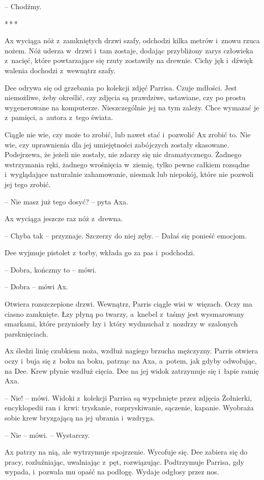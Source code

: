 \documentclass[oneside,polish,11pt,sfheadings]{mwbk}
\newcommand{\threeast}{\bigskip\par\centerline{*\,*\,*}\medskip\par}
\begin{document}
-- Chodźmy.

\threeast

Ax wyciąga nóż z~zamkniętych drzwi szafy, odchodzi kilka metrów i~znowu
rzuca nożem. Nóż uderza w~drzwi i~tam zostaje, dodając przybliżony zarys
człowieka z~nacięć, które powtarzające się rzuty zostawiły na drewnie.
Cichy jęk i~dźwięk walenia dochodzi z~wewnątrz szafy.

Dee odrywa się od grzebania po kolekcji zdjęć Parrisa. Czuje mdłości.
Jest niemożliwe, żeby określić, czy zdjęcia są prawdziwe, ustawiane, czy
po prostu wygenerowane na komputerze. Nieszczególnie jej na tym zależy.
Chce wymazać je z~pamięci, a~autora z~tego świata.

Ciągle nie wie, czy może to zrobić, lub nawet stać i~pozwolić Ax zrobić
to. Nie wie, czy uprawnienia dla jej umiejętności zabójczych zostały
skasowane. Podejrzewa, że jeżeli nie zostały, nie zdarzy się nic
dramatycznego. Żadnego wstrzymania ręki, żadnego wrośnięcia w~ziemię,
tylko pewne całkiem rozsądne i~wyglądające naturalnie zahamowanie,
niesmak lub niepokój, które nie pozwoli jej tego zrobić.

-- Nie masz już tego dosyć? -- pyta Axa.

Ax wyciąga jeszcze raz nóż z~drewna. 

-- Chyba tak -- przyznaje. Szczerzy
do niej zęby. -- Dałaś się ponieść emocjom.

Dee wyjmuje pistolet z~torby, wkłada go za pas i~podchodzi.

-- Dobra, kończmy to -- mówi.

-- Dobra -- mówi Ax.

Otwiera rozszczepione drzwi. Wewnątrz, Parris ciągle wisi w~więzach.
Oczy ma ciasno zamknięte. Łzy płyną po twarzy, a~knebel z~taśmy jest
wysmarowany smarkami, które przyniosły łzy i~który wydmuchał z~nozdrzy w~szalonych parsknięciach.

Ax śledzi linię czubkiem noża, wzdłuż nagiego brzucha mężczyzny. Parris
otwiera oczy i~buja się z~boku na boku, patrząc na Axa, a~potem, jak
gdyby odwołując, na Dee. Krew płynie wzdłuż cięcia. Dee na jej widok
zatrzymuje się i~łapie ramię Axa.

-- Nie! -- mówi. Widoki z~kolekcji Parrisa są wypchnięte przez zdjęcia
Żołnierki, encyklopedii ran i~krwi: tryskanie, rozpryskiwanie, sączenie,
kapanie. Wyobraża sobie krew bryzgającą na jej ubrania i~wzdryga.

-- Nie -- mówi. -- Wystarczy.

Ax patrzy na nią, ale wytrzymuje spojrzenie. Wycofuje się. Dee zabiera
się do pracy, rozluźniając, uwalniając z~pęt, rozwiązując. Podtrzymuje
Parrisa, gdy wypada, i~pozwala mu opaść na podłogę. Wydaje odgłosy przez
nos.
\end{document}
